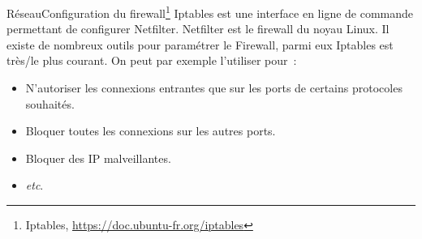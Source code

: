 \documentclass{beamer}
\begin{document}
    \begin{frame}{Réseau}{Configuration du firewall\footnote{\label{iptables}Iptables, \url{https://doc.ubuntu-fr.org/iptables}}}
        Iptables est une interface en ligne de commande permettant de configurer Netfilter.
        Netfilter est le firewall du noyau Linux.
        \bigbreak
        Il existe de nombreux outils pour paramétrer le Firewall, parmi eux Iptables est très/le plus courant.
        \bigbreak
        On peut par exemple l'utiliser pour~:
        \begin{itemize}
            \item N'autoriser les connexions entrantes que sur les ports de certains protocoles souhaités.
            \item Bloquer toutes les connexions sur les autres ports.
            \item Bloquer des IP malveillantes.
            \item \textit{etc}.
        \end{itemize}
    \end{frame}
\end{document}
